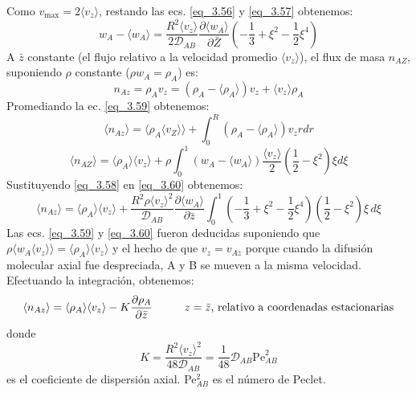 Como $v_{\text{max}}=2\langle v_z\rangle$, restando las ecs. \eqref{eq_3.56} y \eqref{eq_3.57} obtenemos:
\begin{equation}
w_A - \langle w_A \rangle= \frac{R^2 \langle v_z \rangle}{2 \mathscr{D}_{AB}}\frac{\partial \langle w_A \rangle}{\partial \bar{Z}}\left( -\frac{1}{3} + \xi^2 - \frac{1}{2} \xi^4 \right)
\label{eq_3.58}
\end{equation}
A $\bar{z}$ constante (el flujo relativo a la velocidad promedio $\langle v_z \rangle$), el flux de masa $n_{AZ}$, suponiendo $\rho$ constante ($\rho w_A=\rho_A$) es:
\begin{equation}
n_{Az}=\rho_Av_z=(\rho_A-\langle \rho_A\rangle)v_z+\langle v_z\rangle \rho_A
\label{eq_3.59}
\end{equation}
Promediando la ec. \eqref{eq_3.59} obtenemos:
\[
    \langle n_{Az}\rangle=\langle\rho_A\langle v_Z\rangle\rangle+\int^R_0(\rho_A-\langle \rho_A\rangle)v_zrdr
\]
\begin{equation}
    \langle n_{AZ}\rangle=\langle \rho_A\rangle\langle v_z\rangle+\rho \int^1_0(w_A-\langle w_A\rangle)\frac{\langle v_z \rangle}{2}\left(\frac{1}{2}-\xi^2\right)\xi d\xi
    \label{eq_3.60}
\end{equation}
Sustituyendo \eqref{eq_3.58} en \eqref{eq_3.60} obtenemos:
\begin{equation*}
    \langle n_{Az}\rangle=\langle \rho_A\rangle\langle v_z\rangle+\frac{ R^2 \rho \langle v_z \rangle^2}{\mathscr{D}_{AB}}\frac{\partial \langle w_A \rangle}{\partial \bar{z}}\int_0^1 \left(-\frac{1}{3} + \xi^2 - \frac{1}{2} \xi^4\right)\left(\frac{1}{2} - \xi^2\right)\xi \, d\xi
\end{equation*}
Las ecs. \eqref{eq_3.59} y \eqref{eq_3.60} fueron deducidas suponiendo que $\rho\langle w_A\langle v_z\rangle \rangle=\langle \rho_A\rangle\langle v_z\rangle$ y el hecho de que $v_z=v_{Az}$ porque cuando la difusión molecular axial fue despreciada, A y B se mueven a la misma velocidad. Efectuando la integración, obtenemos: 
\begin{equation}
    \langle n_{Az}\rangle=\langle \rho_A\rangle\langle v_z\rangle-K\frac{\partial \rho_A}{\partial \bar{z}}
    \hspace{1 cm} \text{$z=\bar{z}$, relativo a coordenadas estacionarias}
    \label{eq_3.61} 
\end{equation}
donde
\begin{equation}
    K=\frac{R^2\langle v_z\rangle^2}{48\mathscr{D}_{AB}}=\frac{1}{48}\mathscr{D}_{AB}\text{Pe}_{AB}^2
    \label{eq_3.62}
\end{equation}
es el coeficiente de dispersión axial. Pe$_{AB}^2$ es el número de Peclet.

